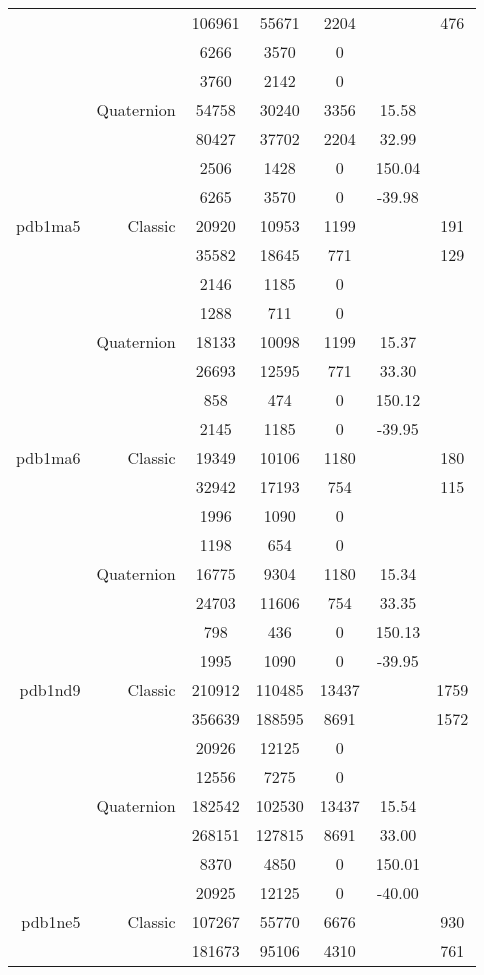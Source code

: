 \begin{xltabular}{\textwidth}{r|rcccSc}
& & 106961 & 55671 & 2204 & & 476 \\
& & 6266 & 3570 & 0 & & \\
& & 3760 & 2142 & 0 & & \\
& Quaternion & 54758 & 30240 & 3356 & 15.58 & \\
& & 80427 & 37702 & 2204 & 32.99 & \\
& & 2506 & 1428 & 0 & 150.04 & \\
& & 6265 & 3570 & 0 & -39.98 & \\ \addlinespace
pdb1ma5 & Classic & 20920 & 10953 & 1199 & & 191 \\
& & 35582 & 18645 & 771 & & 129 \\
& & 2146 & 1185 & 0 & & \\
& & 1288 & 711 & 0 & & \\
& Quaternion & 18133 & 10098 & 1199 & 15.37 & \\
& & 26693 & 12595 & 771 & 33.30 & \\
& & 858 & 474 & 0 & 150.12 & \\
& & 2145 & 1185 & 0 & -39.95 & \\ \addlinespace
pdb1ma6 & Classic & 19349 & 10106 & 1180 & & 180 \\
& & 32942 & 17193 & 754 & & 115 \\
& & 1996 & 1090 & 0 & & \\
& & 1198 & 654 & 0 & & \\
& Quaternion & 16775 & 9304 & 1180 & 15.34 & \\
& & 24703 & 11606 & 754 & 33.35 & \\
& & 798 & 436 & 0 & 150.13 & \\
& & 1995 & 1090 & 0 & -39.95 & \\ \addlinespace
pdb1nd9 & Classic & 210912 & 110485 & 13437 & & 1759 \\
& & 356639 & 188595 & 8691 & & 1572 \\
& & 20926 & 12125 & 0 & & \\
& & 12556 & 7275 & 0 & & \\
& Quaternion & 182542 & 102530 & 13437 & 15.54 & \\
& & 268151 & 127815 & 8691 & 33.00 & \\
& & 8370 & 4850 & 0 & 150.01 & \\
& & 20925 & 12125 & 0 & -40.00 & \\ \addlinespace
pdb1ne5 & Classic & 107267 & 55770 & 6676 & & 930 \\
& & 181673 & 95106 & 4310 & & 761 \\

\end{xltabular}
